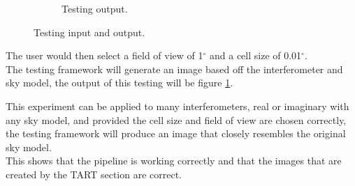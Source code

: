 \begin{figure}[H]
\begin{subfigure}[b]{0.49\textwidth}
    \vspace*{-8mm}
    \caption{Testing output.}
    \label{fig:line_model_recon}
  \end{subfigure}
  \caption{Testing input and output.}
  \label{fig:Testing}
 \end{figure}

The user would then select a field of view of 1$^\circ$ and a cell size of 0.01$^\circ$.\\
The testing framework will generate an image based off the interferometer and sky model, the output of this testing will be figure \ref{fig:line_model_recon}.

This experiment can be applied to many interferometers, real or imaginary with any sky model, and provided the cell size and field of view are chosen correctly, the testing framework will produce an image that closely resembles the original sky model.\\
This shows that the pipeline is working correctly and that the images that are created by the TART section are correct.

